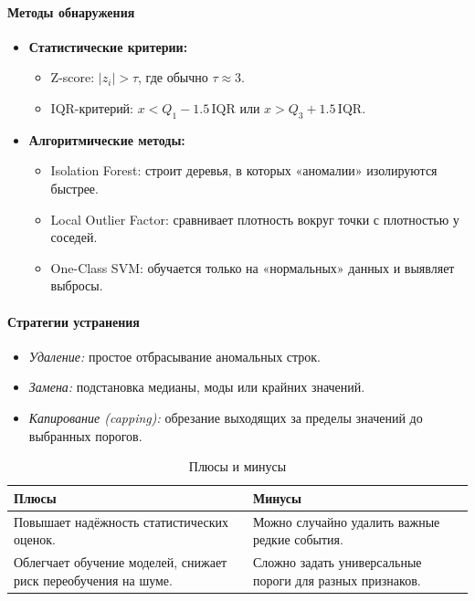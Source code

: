 \paragraph{Методы обнаружения}
\begin{itemize}
  \item \textbf{Статистические критерии:}
    \begin{itemize}
      \item Z-score: 
        $|z_i| > \tau$, где обычно $\tau\approx3$.
      \item IQR-критерий: 
        $x < Q_1 - 1.5\,\mathrm{IQR}$ или $x > Q_3 + 1.5\,\mathrm{IQR}$.
    \end{itemize}

  \item \textbf{Алгоритмические методы:}
    \begin{itemize}
      \item Isolation Forest: строит деревья, в которых «аномалии» изолируются быстрее.
      \item Local Outlier Factor: сравнивает плотность вокруг точки с плотностью у соседей.
      \item One-Class SVM: обучается только на «нормальных» данных и выявляет выбросы.
    \end{itemize}
\end{itemize}

\paragraph{Стратегии устранения}
\begin{itemize}
  \item \emph{Удаление:} простое отбрасывание аномальных строк.
  \item \emph{Замена:} подстановка медианы, моды или крайних значений.
  \item \emph{Капирование (capping):} обрезание выходящих за пределы значений до выбранных порогов.
\end{itemize}

\begin{table}[h]
\centering
\caption{Плюсы и минусы}
\label{tab:pros_cons}
\begin{tabularx}{\textwidth}{@{}>{\raggedright\arraybackslash}X>{\raggedright\arraybackslash}X@{}}
\toprule
\textbf{Плюсы} & \textbf{Минусы} \\
\midrule
Повышает надёжность статистических оценок. & Можно случайно удалить важные редкие события. \\
\addlinespace[0.5em]
Облегчает обучение моделей, снижает риск переобучения на шуме. & Сложно задать универсальные пороги для разных признаков. \\
\bottomrule
\end{tabularx}
\end{table}

